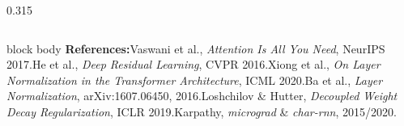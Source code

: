 \documentclass[final]{beamer}
\begin{document}
\begin{frame}[t]
\begin{columns}[t]
\begin{column}{0.315\paperwidth}
\end{column}

\end{columns}

\vspace{0.4cm}
\begin{beamercolorbox}[wd=\paperwidth,sep=0.35cm]{block body}
\footnotesize
\textbf{References:}\;
[1] Vaswani et al., \emph{Attention Is All You Need}, NeurIPS 2017.\quad
[2] He et al., \emph{Deep Residual Learning}, CVPR 2016.\quad
[3] Xiong et al., \emph{On Layer Normalization in the Transformer Architecture}, ICML 2020.\quad
[4] Ba et al., \emph{Layer Normalization}, arXiv:1607.06450, 2016.\quad
[5] Loshchilov \& Hutter, \emph{Decoupled Weight Decay Regularization}, ICLR 2019.\quad
[6] Karpathy, \emph{micrograd} \& \emph{char-rnn}, 2015/2020.
\end{beamercolorbox}
\end{frame}
\end{document}
